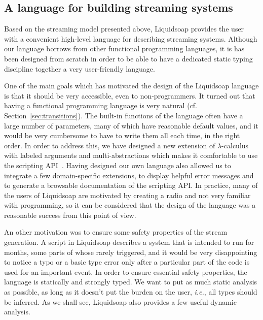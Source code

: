 \documentclass{llncs}
\newcommand{\liquidsoap}{Liquidsoap}
\newcommand{\ie}{\emph{i.e.},}
\newcommand{\cf}{{cf.~}}
\newcommand{\fcaption}[1]{\vspace{-3ex}\caption{#1}\vspace{-4ex}}
\begin{document}
\subsection{A language for building streaming systems}

Based on the streaming model presented above, \liquidsoap{} provides the user
with a convenient high-level language for describing streaming systems.
Although our language borrows from other functional programming languages, it is
has been designed from scratch in order to be able to have a dedicated static
typing discipline together a very user-friendly language. 

One of the main goals which has motivated the design of the \liquidsoap{}
language is that it should be very accessible, even to non-programmers. It
turned out that having a functional programming language is very natural (\cf
Section~\ref{sec:transitions}). The built-in functions of the language often
have a large number of parameters, many of which have reasonable default 
values, and  it would be very cumbersome to have to write them all each time,
in the right order.
In order to address this, we have designed a new extension of
$\lambda$-calculus with labeled arguments and multi-abstractions which makes it
comfortable to use the scripting
API~\cite{baelde-mimram:webradio-lambda}. Having designed our own language also
allowed us to integrate a few domain-specific extensions, to display helpful
error messages and to generate a browsable documentation of the scripting API. In
practice, many of the users of \liquidsoap{} are motivated by creating a radio
and not very familiar with programming, so it can be considered that the design of
the language was a reasonable success from this point of view.

An other motivation was to ensure some safety properties of the stream
generation. A script in \liquidsoap{} describes a system that is intended to run
for months, some parts of whose rarely triggered, and it would be very
disappointing to notice a typo or a basic type error only after a particular
part of the code is used for an important event. In order to ensure essential
safety properties, the language is statically and strongly typed.
We want to put as
much static analysis as possible, as long as it doesn't put the burden on the
user, \ie{} all types should be inferred. As we shall see, \liquidsoap{} also
provides a few useful dynamic analysis.

\end{document}
